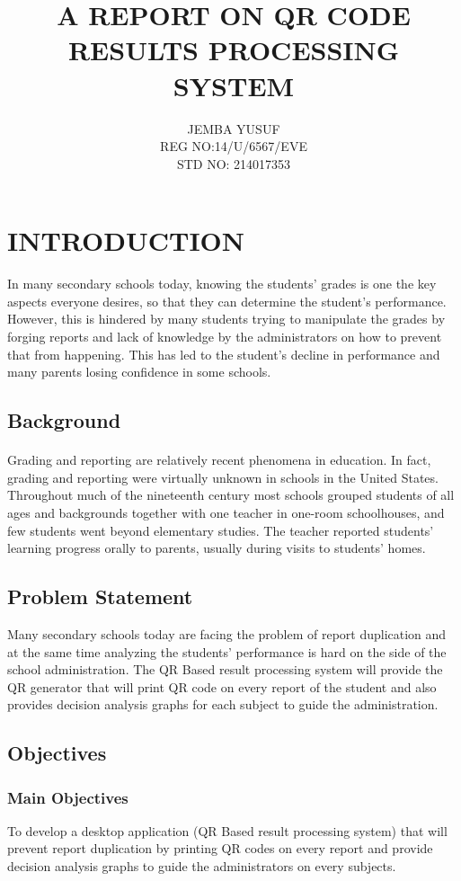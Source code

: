 \documentclass[12pt,letterpaper]{article}
\title{A REPORT ON QR CODE RESULTS PROCESSING SYSTEM}
\author{JEMBA YUSUF\\	REG NO:14/U/6567/EVE\\	STD NO: 214017353}
\begin{document}
\maketitle{}
\newpage
{}
\section{INTRODUCTION}
  In many secondary schools today, knowing the students’ grades is one the key aspects everyone desires, so that they can determine the student’s performance. However, this is hindered by many students trying to manipulate the grades by forging reports and lack of knowledge by the administrators on how to prevent that from happening. This has led to the student’s decline in performance and many parents losing confidence in some schools.   
  \subsection{Background}
   
  \paragraph{}Grading and reporting are relatively recent phenomena in education. In fact, grading and reporting were virtually unknown in schools in the United States. Throughout much of the nineteenth century most schools grouped students of all ages and backgrounds together with one teacher in one-room schoolhouses, and few students went beyond elementary studies. The teacher reported students' learning progress orally to parents, usually during visits to students' homes.
  
\subsection{Problem Statement}
Many secondary schools today are facing the problem of report duplication and at the same time analyzing the students’ performance is hard on the side of the school administration. The QR Based result processing system will provide the QR generator that will print QR code on every report of the student and also provides decision analysis graphs for each subject to guide the administration.
\subsection{Objectives}
\subsubsection{Main Objectives}
To develop a desktop application (QR Based result processing system) that will prevent report duplication by printing QR codes on every report and provide decision analysis graphs to guide the administrators on every subjects.
\end{document}
